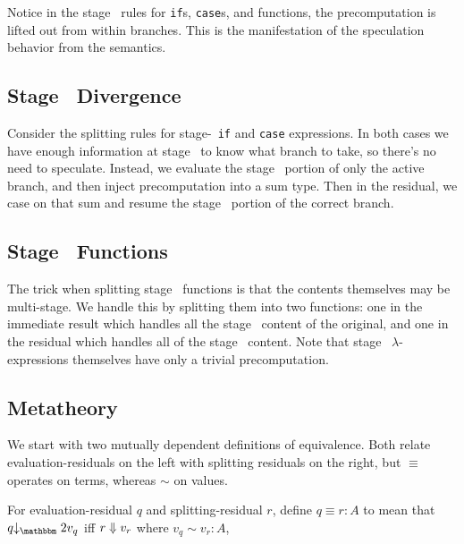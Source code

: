 Notice in the stage \bbtwo\ rules for {\tt if}s, {\tt case}s, and functions, the precomputation is lifted out from within branches.
This is the manifestation of the speculation behavior from the semantics.

\subsection {Stage \bbone\ Divergence}
Consider the splitting rules for stage-\bbone\ {\tt if} and {\tt case} expressions.
In both cases we have enough information at stage \bbone\ to know what branch to take, so there's no need to speculate.
Instead, we evaluate the stage \bbone\ portion of only the active branch, and then inject precomputation into a sum type.
Then in the residual, we case on that sum and resume the stage \bbtwo\ portion of the correct branch.

\subsection {Stage \bbone\ Functions}

The trick when splitting stage \bbone\ functions is that the contents themselves may be multi-stage.
We handle this by splitting them into two functions:
one in the immediate result which handles all the stage \bbone\ content of the original,
and one in the residual which handles all of the stage \bbtwo\ content.
Note that stage \bbone\ $\lambda$-expressions themselves have only a trivial precomputation.

%
%



\subsection{Metatheory}

We start with two mutually dependent definitions of equivalence.  
Both relate evaluation-residuals on the left with splitting residuals on the right,
but $\equiv$ operates on terms, whereas $\sim$ on values.

\begin{definition}
For evaluation-residual $q$ and splitting-residual $r$, define $q \equiv r : A$ to mean that 
$q \tworedsym v_q$ iff ${r} \Downarrow {v_r}$ where $v_q \sim v_r : A$, 
\end{definition}

